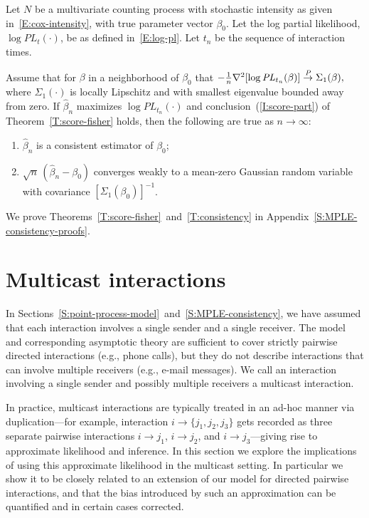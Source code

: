 \documentclass[final]{statsoc}
\begin{document}
\begin{theorem}\label{T:consistency}
    Let $N$ be a multivariate counting process with stochastic
    intensity as given in~\eqref{E:cox-intensity}, with true parameter
    vector $\beta_0$.  Let the log partial likelihood,
    $\log \mathit{PL}_t(\cdot)$, be as defined in~\eqref{E:log-pl}.
    Let $t_n$ be the sequence of interaction times.

    Assume that for $\beta$ in a
    neighborhood of $\beta_0$ that
    \(
        -\tfrac{1}{n} \nabla^2 [ \log \mathit{PL}_{t_n}(\beta)]
            \overset{\mathit{P}}{\to} \Sigma_1(\beta),
    \)
    where $\Sigma_1(\cdot)$ is locally Lipschitz and with smallest
    eigenvalue bounded away from zero.
    If $\hat \beta_n$ maximizes $\log \mathit{PL}_{t_n}(\cdot)$ and
    conclusion~(\ref{I:score-part}) of Theorem~\ref{T:score-fisher} holds,
    then the following are true as $n\to\infty$:
    \begin{enumerate}
        \item $\hat \beta_n$ is a consistent estimator of $\beta_0$;
        \item $\sqrt{n} \, (\hat \beta_n - \beta_0)$ converges weakly
            to a mean-zero Gaussian random variable with covariance
            $[\Sigma_1(\beta_0)]^{-1}$.
    \end{enumerate}
\end{theorem}

We prove Theorems~\ref{T:score-fisher}~and~\ref{T:consistency} in Appendix~\ref{S:MPLE-consistency-proofs}.

\section{Multicast interactions}\label{S:multiple-receivers}

In Sections~\ref{S:point-process-model}~and~\ref{S:MPLE-consistency},
we have assumed that each interaction involves a single sender and a single
receiver.  The model and corresponding asymptotic theory are sufficient to
cover strictly pairwise directed interactions (e.g., phone calls), but they
do not describe interactions that can involve multiple receivers (e.g.,
e-mail messages).  We call an interaction involving a single sender and
possibly multiple receivers a multicast interaction.

In practice, multicast interactions are typically treated in an ad-hoc manner
via duplication---for example, interaction $i \to \{ j_1, j_2, j_3 \}$ gets
recorded as three separate pairwise interactions $i \to j_1$, $i \to j_2$,
and $i \to j_3$---giving rise to approximate likelihood and inference.
In this section we explore the implications of using this approximate
likelihood in the multicast setting.  In particular we show it to be closely
related to an extension of our model for directed pairwise interactions, and
that the bias introduced by such an approximation can be quantified and in
certain cases corrected.
\end{document}
